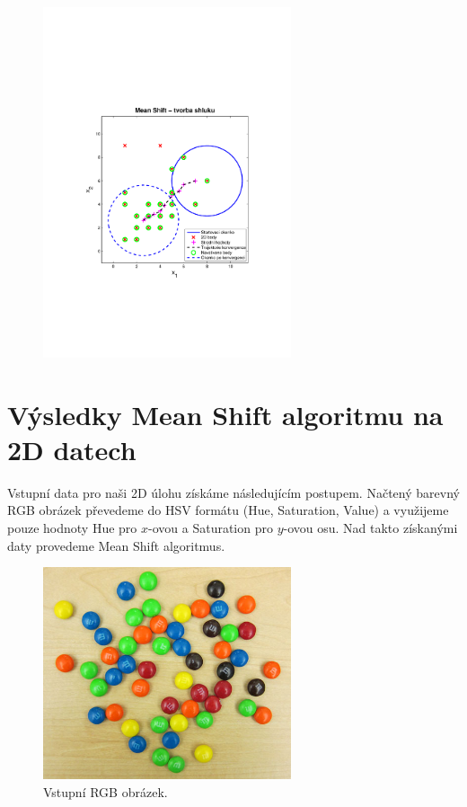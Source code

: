 \documentclass[12pt, a4paper]{article}
\begin{document}
\begin{figure}[!ht]
	\centering
	\includegraphics[width = 0.65\textwidth, trim = 3.5cm 8.5cm 3.5cm 9.5cm]{MeanShift.pdf}
	\label{fig:MeanShift}
\end{figure}

\newpage













\section{Výsledky Mean Shift algoritmu na 2D datech}
\par{Vstupní data pro naši 2D úlohu získáme následujícím postupem. Načtený barevný RGB obrázek převedeme do HSV formátu (Hue, Saturation, Value) a využijeme pouze hodnoty Hue pro $x$-ovou a Saturation pro $y$-ovou osu. Nad takto získanými daty provedeme Mean Shift algoritmus.}



\begin{figure}[!ht]
	\centering
	\includegraphics[width = 0.65\textwidth]{mms.jpg}
	\caption{Vstupní RGB obrázek.}	
	\label{fig:mms}
\end{figure}
\end{document}
